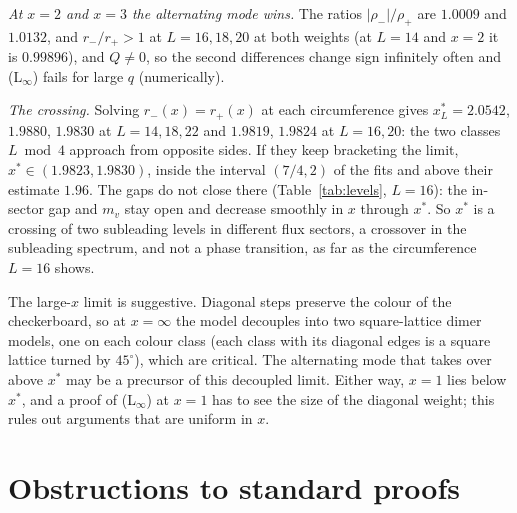 \documentclass[11pt]{amsart}
\theoremstyle{definition}
\theoremstyle{remark}
\begin{document}
\emph{At $x = 2$ and $x = 3$ the alternating mode wins.} The ratios $|\rho_-|/\rho_+$ are $1.0009$ and
$1.0132$, and $r_-/r_+ > 1$ at $L = 16, 18, 20$ at both weights (at $L = 14$ and $x = 2$ it is
$0.99896$), and $Q \ne 0$, so the second differences
change sign infinitely often and (L$_\infty$) fails for large $q$ (numerically).

\emph{The crossing.} Solving $r_-(x) = r_+(x)$ at each circumference gives $x^*_L = 2.0542$, $1.9880$,
$1.9830$ at $L = 14, 18, 22$ and $1.9819$, $1.9824$ at $L = 16, 20$: the two classes $L \bmod 4$
approach from opposite sides. If they keep bracketing the limit, $x^* \in (1.9823, 1.9830)$, inside the
interval $(7/4, 2)$ of the fits and above their estimate $1.96$. The gaps do not close there
(Table~\ref{tab:levels}, $L = 16$): the in-sector gap and $m_v$ stay open and decrease smoothly in $x$
through $x^*$. So $x^*$ is a crossing of two subleading levels in different flux sectors, a crossover
in the subleading spectrum, and not a phase transition, as far as the circumference $L = 16$ shows.

The large-$x$ limit is suggestive. Diagonal steps preserve the colour of the checkerboard, so at
$x = \infty$ the model decouples into two square-lattice dimer models, one on each colour class
(each class with its diagonal edges is a square lattice turned by $45^\circ$), which are critical.
The alternating mode that takes over above $x^*$ may be a precursor of this decoupled limit.
Either way, $x = 1$ lies below $x^*$, and a proof of (L$_\infty$) at $x = 1$ has to see the size of the
diagonal weight; this rules out arguments that are uniform in $x$.

\section{Obstructions to standard proofs}\label{sec:obstructions}
\end{document}
